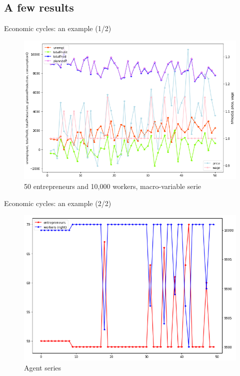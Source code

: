 \documentclass[9pt]{beamer}
\begin{document}
\subsection{A few results}

\begin{frame}{Economic cycles: an example (1/2)}

\begin{figure}[H]

\includegraphics[scale=0.3]{output_23_1.png}
\caption{50 entrepreneurs and 10,000 workers, macro-variable serie} 
\label{ris1}
\end{figure}

\end{frame}

\begin{frame}{Economic cycles: an example (2/2)}

\begin{figure}[H]

\includegraphics[scale=0.3]{output_26_1.png}
\caption{Agent series} 
\label{ris2}
\end{figure}

\end{frame}
\end{document}
